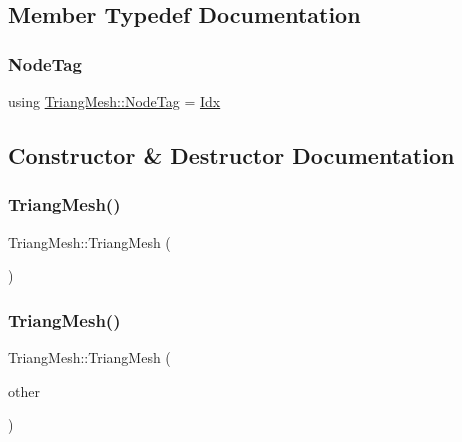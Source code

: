 \subsection{Member Typedef Documentation}
\mbox{\label{structTriangMesh_a9883abab211497b807f24e6e46f4b8f6}} 
\subsubsection{\texorpdfstring{Node\+Tag}{NodeTag}}
{\footnotesize\ttfamily using \hyperlink{structTriangMesh_a9883abab211497b807f24e6e46f4b8f6}{Triang\+Mesh\+::\+Node\+Tag} =  \hyperlink{Includes_8h_ae78891cd308078a2f5f9e7193065c805}{Idx}}



\subsection{Constructor \& Destructor Documentation}
\mbox{\label{structTriangMesh_a704b5960ace0f96b30a63d0d757c0a9f}} 
\subsubsection{\texorpdfstring{Triang\+Mesh()}{TriangMesh()}\hspace{0.1cm}{\footnotesize\ttfamily [1/4]}}
{\footnotesize\ttfamily Triang\+Mesh\+::\+Triang\+Mesh (\begin{DoxyParamCaption}{ }\end{DoxyParamCaption})\hspace{0.3cm}{\ttfamily [default]}}

\mbox{\label{structTriangMesh_adf054ce5bd623c810c9544fb11fc181c}} 
\subsubsection{\texorpdfstring{Triang\+Mesh()}{TriangMesh()}\hspace{0.1cm}{\footnotesize\ttfamily [2/4]}}
{\footnotesize\ttfamily Triang\+Mesh\+::\+Triang\+Mesh (\begin{DoxyParamCaption}\item[{\hyperlink{structTriangMesh}{Triang\+Mesh} \&\&}]{other }\end{DoxyParamCaption})\hspace{0.3cm}{\ttfamily [default]}}

